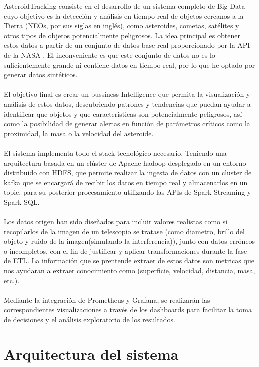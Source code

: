 \documentclass[12pt]{article}
\begin{document}
AsteroidTracking consiste en el desarrollo de un sistema completo de Big Data cuyo objetivo es la detección 
y análisis en tiempo real de objetos cercanos a la Tierra (NEOs, por sus siglas en inglés), como asteroides,
cometas, satélites y otros tipos de objetos potencialmente peligrosos. La idea principal es obtener estos datos
a partir de un conjunto de datos base real proporcionado por la API de la NASA  \cite[(Sentry System)]{Sentry-System}.
El inconveniente es que este conjunto de datos no es lo suficientemente grande ni contiene datos en tiempo real,
por lo que he optado por generar datos sintéticos.
\\
\\
El objetivo final es crear un bussiness Intelligence que permita la visualización y análisis de estos datos,
descubriendo patrones y tendencias que puedan ayudar a identificar que objetos y que características son
potencialmente peligrosos, así como la posibilidad de generar alertas en función de parámetros críticos como
la proximidad, la masa o la velocidad del asteroide.
\\
\\
El sistema implementa todo el stack tecnológico necesario. Teniendo una arquitectura basada en 
un clúster de Apache hadoop desplegado en un entorno distribuido con HDFS, que permite realizar
la ingesta de datos con un cluster de kafka que se encargará de recibir
los datos en tiempo real y almacenarlos en un topic. para su posterior procesamiento utilizando
las APIs de Spark Streaming y Spark SQL.
\\
\\
Los datos origen han sido diseñados para incluir valores realistas como si recopilarlos de la imagen
de un telescopio se tratase (como diametro, brillo del objeto y ruido de la imagen(simulando la interferencia)), 
junto con datos erróneos o incompletos, con el fin de justificar y aplicar transformaciones durante la fase de ETL.
La información que se prentende extraer de estos datos son metricas que nos ayudaran a extraer conocimiento como
(superficie, velocidad, distancia, masa, etc.).
\\
\\
Mediante la integración de Prometheus y Grafana, se realizarán las correspondientes visualizaciones 
a través de los dashboards para facilitar la toma de decisiones y el análisis exploratorio de 
los resultados.

\clearpage

\section{Arquitectura del sistema}
\end{document}
